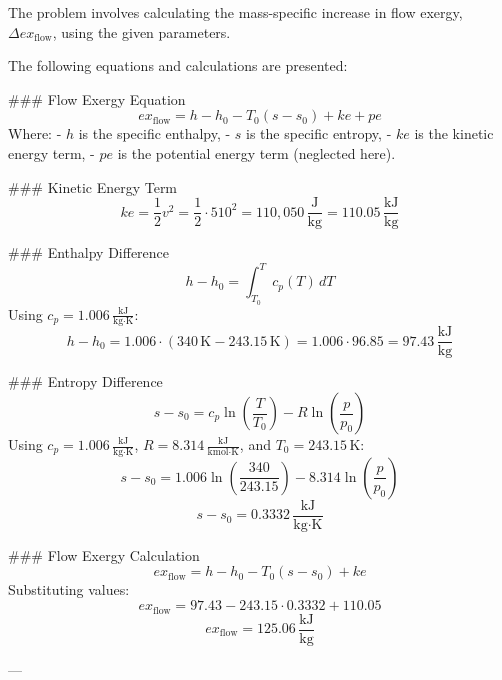 The problem involves calculating the mass-specific increase in flow exergy, \( \Delta ex_{\text{flow}} \), using the given parameters.  

The following equations and calculations are presented:  

### Flow Exergy Equation  
\[
ex_{\text{flow}} = h - h_0 - T_0 (s - s_0) + ke + pe
\]  
Where:  
- \( h \) is the specific enthalpy,  
- \( s \) is the specific entropy,  
- \( ke \) is the kinetic energy term,  
- \( pe \) is the potential energy term (neglected here).  

### Kinetic Energy Term  
\[
ke = \frac{1}{2} v^2 = \frac{1}{2} \cdot 510^2 = 110,050 \, \frac{\text{J}}{\text{kg}} = 110.05 \, \frac{\text{kJ}}{\text{kg}}
\]  

### Enthalpy Difference  
\[
h - h_0 = \int_{T_0}^{T} c_p(T) \, dT
\]  
Using \( c_p = 1.006 \, \frac{\text{kJ}}{\text{kg·K}} \):  
\[
h - h_0 = 1.006 \cdot (340 \, \text{K} - 243.15 \, \text{K}) = 1.006 \cdot 96.85 = 97.43 \, \frac{\text{kJ}}{\text{kg}}
\]  

### Entropy Difference  
\[
s - s_0 = c_p \ln \left( \frac{T}{T_0} \right) - R \ln \left( \frac{p}{p_0} \right)
\]  
Using \( c_p = 1.006 \, \frac{\text{kJ}}{\text{kg·K}} \), \( R = 8.314 \, \frac{\text{kJ}}{\text{kmol·K}} \), and \( T_0 = 243.15 \, \text{K} \):  
\[
s - s_0 = 1.006 \ln \left( \frac{340}{243.15} \right) - 8.314 \ln \left( \frac{p}{p_0} \right)
\]  
\[
s - s_0 = 0.3332 \, \frac{\text{kJ}}{\text{kg·K}}
\]  

### Flow Exergy Calculation  
\[
ex_{\text{flow}} = h - h_0 - T_0 (s - s_0) + ke
\]  
Substituting values:  
\[
ex_{\text{flow}} = 97.43 - 243.15 \cdot 0.3332 + 110.05
\]  
\[
ex_{\text{flow}} = 125.06 \, \frac{\text{kJ}}{\text{kg}}
\]  

---